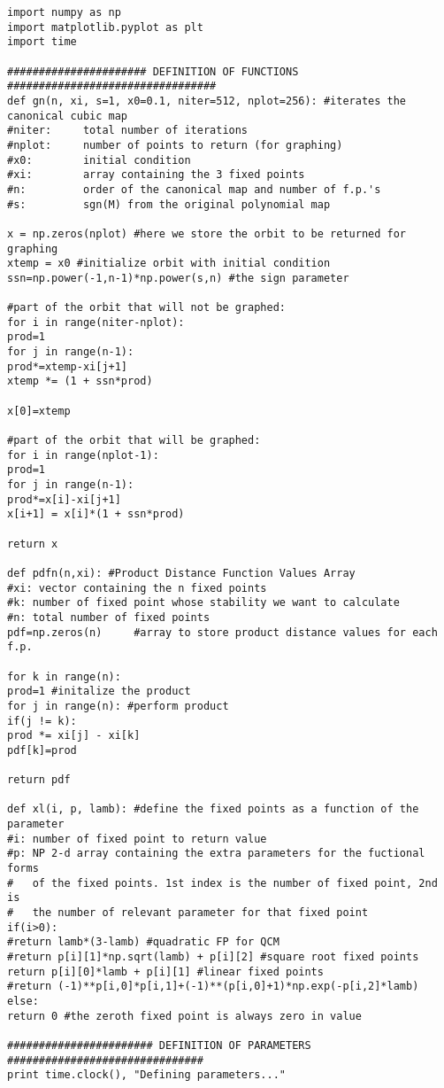 \documentclass[10pt,twoside,titlepage]{book}
\numberwithin{equation}{chapter}
\numberwithin{figure}{chapter}
\numberwithin{table}{chapter}
\theoremstyle{plain}%
\theoremstyle{definition}
\theoremstyle{remark}
\begin{document}
\begin{verbatim}
import numpy as np
import matplotlib.pyplot as plt
import time

###################### DEFINITION OF FUNCTIONS #################################
def gn(n, xi, s=1, x0=0.1, niter=512, nplot=256): #iterates the canonical cubic map
#niter:     total number of iterations
#nplot:     number of points to return (for graphing)
#x0:        initial condition
#xi:        array containing the 3 fixed points
#n:         order of the canonical map and number of f.p.'s
#s:         sgn(M) from the original polynomial map

x = np.zeros(nplot) #here we store the orbit to be returned for graphing
xtemp = x0 #initialize orbit with initial condition
ssn=np.power(-1,n-1)*np.power(s,n) #the sign parameter

#part of the orbit that will not be graphed:
for i in range(niter-nplot):
prod=1
for j in range(n-1):
prod*=xtemp-xi[j+1]
xtemp *= (1 + ssn*prod)

x[0]=xtemp

#part of the orbit that will be graphed:
for i in range(nplot-1):
prod=1
for j in range(n-1):
prod*=x[i]-xi[j+1]
x[i+1] = x[i]*(1 + ssn*prod)

return x

def pdfn(n,xi): #Product Distance Function Values Array
#xi: vector containing the n fixed points
#k: number of fixed point whose stability we want to calculate
#n: total number of fixed points
pdf=np.zeros(n)     #array to store product distance values for each f.p.

for k in range(n):
prod=1 #initalize the product
for j in range(n): #perform product
if(j != k):
prod *= xi[j] - xi[k]
pdf[k]=prod

return pdf

def xl(i, p, lamb): #define the fixed points as a function of the parameter
#i: number of fixed point to return value
#p: NP 2-d array containing the extra parameters for the fuctional forms
#   of the fixed points. 1st index is the number of fixed point, 2nd is
#   the number of relevant parameter for that fixed point
if(i>0):
#return lamb*(3-lamb) #quadratic FP for QCM
#return p[i][1]*np.sqrt(lamb) + p[i][2] #square root fixed points
return p[i][0]*lamb + p[i][1] #linear fixed points
#return (-1)**p[i,0]*p[i,1]+(-1)**(p[i,0]+1)*np.exp(-p[i,2]*lamb)
else:
return 0 #the zeroth fixed point is always zero in value

####################### DEFINITION OF PARAMETERS ###############################
print time.clock(), "Defining parameters..."


\end{verbatim}
\end{document}
